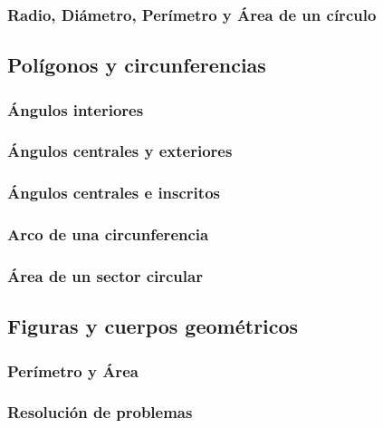 \documentclass[12pt,addpoints,answers]{evalua}
\begin{document}
\begin{questions}
	\subsubsection{Radio, Diámetro, Perímetro y Área de un círculo}
	\question[1]{}
	\subsection   {Polígonos y circunferencias}
	\subsubsection{Ángulos interiores}
	\question[1]{}
	\subsubsection{Ángulos centrales y exteriores}
	\question[1]{}
	\subsubsection{Ángulos centrales e inscritos}
	\question[1]{}
	\subsubsection{Arco de una circunferencia}
	\question[1]{}
	\subsubsection{Área de un sector circular}
	\question[1]{}
	\subsection   {Figuras y cuerpos geométricos}
	\subsubsection{Perímetro y Área}
	\question[1]{}
	\subsubsection{Resolución de problemas}
	\question[1]{}

\end{questions}
\end{document}
